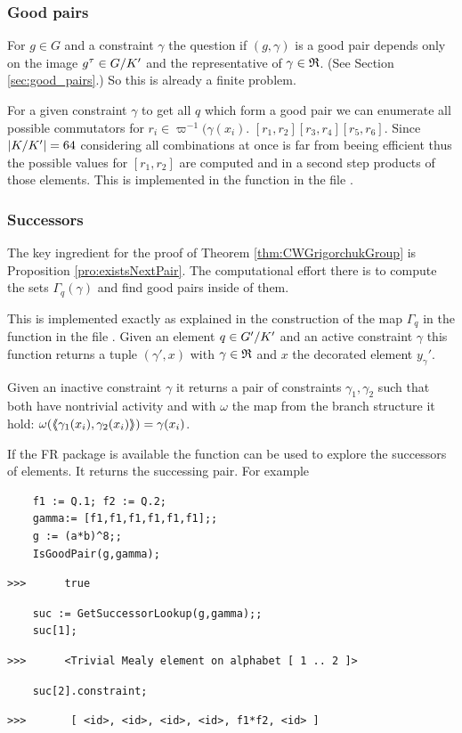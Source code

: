 \documentclass[a4paper,11pt]{amsart}
\begin{document}
\subsubsection{Good pairs}
For $g\in G$ and a constraint $\gamma$ the question if $(g,\gamma)$ is a good
pair depends only on the image $g^\tau\in{G/K'}$ and the representative
of $\gamma\in\mathfrak{R}$. (See Section \ref{sec:good_pairs}.) So this is already a
finite problem. 

For a given constraint $\gamma$ to get all $q$ which form a good pair we can
enumerate all possible commutators for $r_i\in\varpi^{-1}(\gamma(x_i)$.
$[r_1,r_2][r_3,r_4][r_5,r_6]$. Since $\lvert{K/K'}\rvert=64$ considering all 
combinations at once is far from beeing efficient thus the possible values for
$[r_1,r_2]$ are computed and in a second step products of those elements.
This is implemented in the function  in the file
.
\subsubsection{Successors}
The key ingredient for the proof of Theorem \ref{thm:CWGrigorchukGroup} is
Proposition \ref{pro:existsNextPair}. The computational effort there is
to compute the sets $\Gamma_q(\gamma)$ and find good pairs inside of them.

This is implemented exactly as explained in the construction of the map
$\Gamma_q$ in the function  in the file 
. Given an element $q\in{G'/K'}$ 
and an active constraint $\gamma$ this function returns a tuple $(\gamma',x)$ 
with $\gamma\in\mathfrak{R}$ and $x$ the decorated element $y_\gamma'$.

Given an inactive constraint $\gamma$ it returns a pair of constraints
$\gamma_1,\gamma_2$ such that both have nontrivial activity and with
$\omega$ the map from the branch structure it hold:
$\omega(\langle\negthickspace\langle\gamma_1(x_i),\gamma_2(x_i)\rangle\negthickspace\rangle)=\gamma(x_i)$. 

If the FR package is available
the function  can be used to explore the
successors of elements. It returns the successing pair. For example
 \begin{lstlisting}
    f1 := Q.1; f2 := Q.2;
    gamma:= [f1,f1,f1,f1,f1,f1];;
    g := (a*b)^8;;
    IsGoodPair(g,gamma);
\end{lstlisting}
\begin{verbatim}
>>>      true
\end{verbatim} 
\begin{lstlisting}
    suc := GetSuccessorLookup(g,gamma);;    
    suc[1];
\end{lstlisting}
\begin{verbatim}
>>>      <Trivial Mealy element on alphabet [ 1 .. 2 ]>
\end{verbatim} 
\begin{lstlisting}
    suc[2].constraint;
\end{lstlisting}
\begin{verbatim}
>>>       [ <id>, <id>, <id>, <id>, f1*f2, <id> ]
\end{verbatim} 
\end{document}
